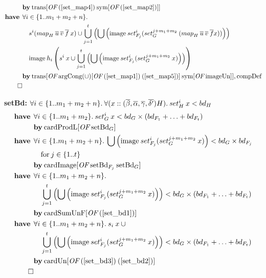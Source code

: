 \begin{align}
 & \by \OF{\text{trans}}{(\ref{set_map4}) \: \OF{\text{sym}}{(\ref{set_map2})}} \nonumber \\
%
\have & \forall i \in \{1..m_1+m_2+n\}. \nonumber \\*
& \quad s^i (\map{H}{u}{v}{f} \: x) \cup \bigcup_{j=1}^t \left(\bigcup \left( \text{image} \: set_{F_j}^i (set_G^{j+m_1+m_2} \: (\map{H}{u}{v}{f} x)) \right) \right) \nonumber \\*
& \quad \text{image} \: h_i \left( s^i \: x \cup \bigcup_{j=1}^t \left(\bigcup \left( \text{image} \: set_{F_j}^i (set_G^{j+m_1+m_2} \: x) \right) \right) \right) \\*
 & \by \OF{\text{trans}}{\OF{\text{argCong}(\cup)}{(\ref{set_map1}) \: (\ref{set_map5})} \: \OF{\text{sym}}{\text{imageUn}}}, \text{compDef} \nonumber \\*
\qed \nonumber
\end{align}

\textbf{setBd:} $\forall i \in \{1..m_1+m_2+n\}. \: \forall (x :: (\overline{\beta}, \overline{\alpha}, \overline{\gamma}, \overline{\delta'}) H). \: set_H^i \: x < bd_H$
\begin{align}
\have & \forall i \in \{1..m_1+m_2\}. \: set_G^i \: x < bd_G \times (bd_{F_1} + \dots + bd_{F_t}) \label{set_bd3} \\*
& \by \OF{\text{cardProdL}}{\text{setBd}_G} \nonumber \\
%
\have & \forall i \in \{1.m_1+m_2+n\}. \: \bigcup \left( \text{image} \: set_{F_j}^i (set_G^{j+m_1+m_2} \: x) \right) < bd_G \times bd_{F_j} \label{set_bd1} \\*
 & \quad \text{for} \: j \in \{1..t\} \nonumber \\*
 & \by \OF{\text{cardImage}}{\text{setBd}_{F_j} \: \text{setBd}_G} \nonumber \\
%
\have & \forall i \in \{1..m_1+m_2+n\}. \nonumber \\*
& \quad \bigcup_{j=1}^t \left(\bigcup \left( \text{image} \: set_{F_j}^i (set_G^{j+m_1+m_2} \: x) \right) \right) < bd_G \times (bd_{F_1} + \dots + bd_{F_t}) \label{set_bd2} \\*
& \by \OF{\text{cardSumUnF}}{(\ref{set_bd1})} \nonumber \\
%
\have & \forall i \in \{1..m_1+m_2+n\}. \: s_i \: x \: \cup \nonumber \\*
& \quad \bigcup_{j=1}^t \left(\bigcup \left( \text{image} \: set_{F_j}^i (set_G^{j+m_1+m_2} \: x) \right) \right) < bd_G \times (bd_{F_1} + \dots + bd_{F_t}) \\*
& \by \OF{\text{cardUn}}{(\ref{set_bd3}) \: (\ref{set_bd2})} \nonumber \\*
\qed \nonumber
\end{align}

